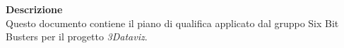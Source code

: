 \begin{titlepage}
\begin{center}
	\large \textbf{Descrizione} \\
	Questo documento contiene il piano di qualifica applicato dal gruppo Six Bit Busters
	per il progetto \textit{3Dataviz}.
	
	
	\end{center}
\end{titlepage}

